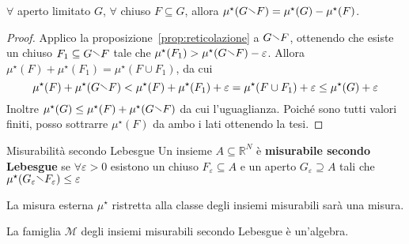\begin{proposition}\label{prop:prop_4}
\(\forall \) aperto limitato \(G\), \(\forall \) chiuso \(F \subseteq G \),
allora \(\mu^\star(G \sminus F) = \mu^\star(G) - \mu^\star(F)\).
\end{proposition}
\begin{proof}
Applico la
proposizione~\ref{prop:reticolazione} a \(G \sminus F\), ottenendo che esiste un
chiuso \(F_{1} \subseteq G \sminus F \) tale che \(\mu^\star(F_{1}) >
\mu^\star(G \sminus F) - \varepsilon\). Allora \(\mu^\star(F) + \mu^\star(F_{1})
= \mu^\star(F \cup F_{1})\), da cui
\[
    \mu^\star(F) + \mu^\star(G\sminus F) < \mu^\star(F) + \mu^\star(F_{1}) +
    \varepsilon = \mu^\star(F \cup F_{1}) + \varepsilon \le \mu^\star(G) + \varepsilon
\]
Inoltre \(\mu^\star(G) \le \mu^\star(F) + \mu^\star(G\sminus F)\) da cui
l'uguaglianza. Poiché sono tutti valori finiti, posso sottrarre \(\mu^\star(F)\)
da ambo i lati ottenendo la tesi.
\end{proof}
\begin{definition}{Misurabilità secondo Lebesgue}
    Un insieme \(A \subseteq \mathbb{R}^{N} \) è \textbf{misurabile secondo
    Lebesgue} se \(\forall \varepsilon > 0\) esistono un chiuso \(F_\varepsilon
    \subseteq A \) e un aperto \(G_\varepsilon \supseteq A \) tali che
    \(\mu^\star(G_\varepsilon \sminus F_\varepsilon) \le \varepsilon\) 
\end{definition}
\begin{remark}
    La misura esterna \(\mu^\star\) ristretta alla classe degli insiemi
    misurabili sarà una misura.
\end{remark}
\begin{theorem}
    La famiglia \(\mathcal{M}\) degli insiemi misurabili secondo Lebesgue è
    un'algebra.
\end{theorem}
